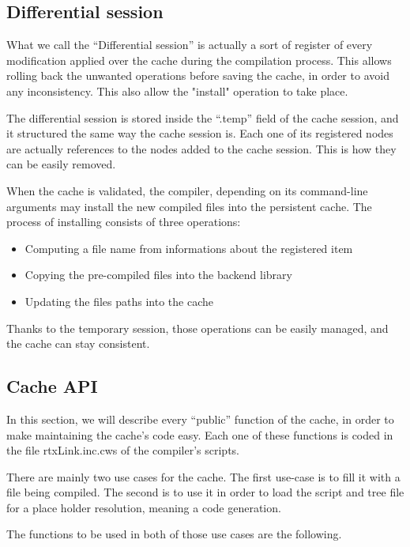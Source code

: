 \documentclass[american]{rtxreport}
\begin{document}
\subsection{Differential session}

What we call the ``Differential session'' is actually a sort of register of
every modification applied over the cache during the compilation process. This
allows rolling back the unwanted operations before saving the cache, in order
to avoid any inconsistency. This also allow the "install" operation to take
place.

The differential session is stored inside the ``.temp'' field of the cache
session, and it structured the same way the cache session is. Each one of its
registered nodes are actually references to the nodes added to the cache
session. This is how they can be easily removed.

When the cache is validated, the compiler, depending on its command-line
arguments may install the new compiled files into the persistent cache. The
process of installing consists of three operations:
\begin{itemize}
    \item Computing a file name from informations about the registered item
    \item Copying the pre-compiled files into the backend library
    \item Updating the files paths into the cache
\end{itemize}

Thanks to the temporary session, those operations can be easily managed, and
the cache can stay consistent.


\subsection{Cache API}

In this section, we will describe every ``public'' function of the cache, in
order to make maintaining the cache's code easy. Each one of these functions is
coded in the file rtxLink.inc.cws of the compiler's scripts.

There are mainly two use cases for the cache. The first use-case is to fill it
with a file being compiled. The second is to use it in order to load the script
and tree file for a place holder resolution, meaning a code generation.

\vspace{20pt}

The functions to be used in both of those use cases are the following.
\end{document}
